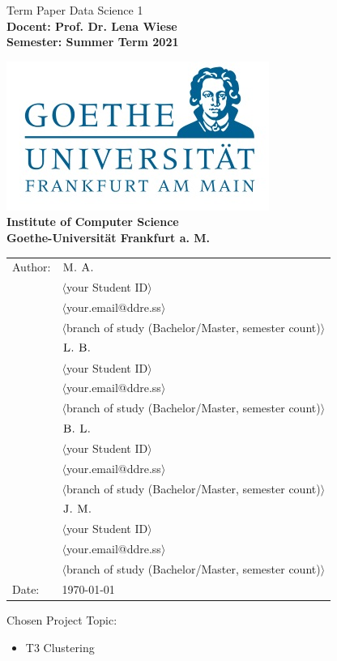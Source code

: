 \begin{center}

{\Huge {
Term Paper Data Science 1}
}
\\[2ex]

\textbf{
\Large 
Docent: Prof. Dr. Lena Wiese \\ 
Semester: Summer Term 2021\\  
}



\includegraphics[scale=0.4]{images/logo.jpg} \\ 
\large{\textbf{Institute of Computer Science \\ Goethe-Universit\"at Frankfurt a. M.}}



\begin{Large}
\begin{tabular}{ll}
Author: & $\textsc{M. A.}$ \\
& $\langle$your Student ID$\rangle$\\
& $\langle$your.email@ddre.ss$\rangle$ \\
& $\langle$branch of study (Bachelor/Master, semester count)$\rangle$ \\
& $\textsc{L. B.}$ \\
& $\langle$your Student ID$\rangle$\\
& $\langle$your.email@ddre.ss$\rangle$ \\
& $\langle$branch of study (Bachelor/Master, semester count)$\rangle$ \\
& $\textsc{B. L.}$ \\
& $\langle$your Student ID$\rangle$\\
& $\langle$your.email@ddre.ss$\rangle$ \\
& $\langle$branch of study (Bachelor/Master, semester count)$\rangle$ \\
& $\textsc{J. M.}$ \\
& $\langle$your Student ID$\rangle$\\
& $\langle$your.email@ddre.ss$\rangle$ \\
& $\langle$branch of study (Bachelor/Master, semester count)$\rangle$ \\
Date: & \today \\		
\end{tabular}
\end{Large}

\end{center}

\vspace*{\fill}

\large
\noindent{}Chosen Project Topic: \\
\begin{itemize}
\item T3 Clustering
\end{itemize}